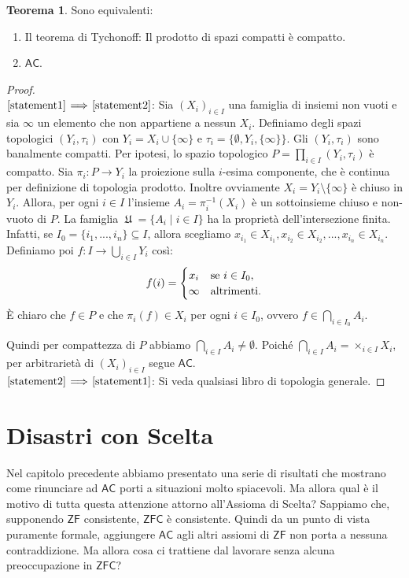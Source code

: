 \documentclass[12pt,a4paper]{report}
\theoremstyle{definition}
\newtheorem{teo}{Teorema}[section]  %
\theoremstyle{num.custom-title}
\DeclareMathOperator{\U}{\mathfrak{U}}
\DeclareMathOperator{\sm}{\setminus}
\DeclareMathOperator{\sse}{\subseteq}
\newcommand{\AC}{\ensuremath{\mathsf{AC}}\xspace}
\newcommand{\ZF}{\ensuremath{\mathsf{ZF}}\xspace}
\newcommand{\ZFC}{\ensuremath{\mathsf{ZFC}}\xspace}
\newcommand{\Implies}[2]{$\text{\ref{statement#1}}\!\implies\!\text{\ref{statement#2}}$}%
\newcommand{\punto}[1]{\item \label{statement#1}}
\newenvironment{equivalence}
    {\begin{enumerate}[label=(\arabic*),ref=(\arabic*)]
    }
    { 
	\end{enumerate}
    }
\begin{document}
\begin{teo} Sono equivalenti:
\begin{equivalence}
\punto{1} Il teorema di Tychonoff: Il prodotto di spazi compatti è compatto.
\punto{2} \AC.
\end{equivalence}
\begin{proof}\ \\
\Implies{1}{2}: Sia $(X_i)_{i \in I}$ una famiglia di insiemi non vuoti e sia $\infty$ un elemento che non appartiene a nessun $X_i$. Definiamo degli spazi topologici $(Y_i, \tau_i)$ con $Y_i = X_i \cup \{\infty\}$ e $\tau_i=\big\{\emptyset, Y_i, \{\infty\}\big\}$. Gli $(Y_i,\tau_i)$ sono banalmente compatti. Per ipotesi, lo spazio topologico $P= \prod_{i \in I} (Y_i, \tau_i)$ è compatto. Sia $\pi_i: P \to Y_i$ la proiezione sulla $i$-esima componente, che è continua per definizione di topologia prodotto. Inoltre ovviamente $X_i=Y_i \sm \{\infty\}$ è chiuso in $Y_i$. Allora, per ogni $i \in I$ l'insieme $A_i=\pi_i^{-1}(X_i)$ è un sottoinsieme chiuso e non-vuoto di $P$. La famiglia $\U=\{A_i \mid i \in I\}$ ha la proprietà dell'intersezione finita. Infatti, se $I_0=\{i_1,...,i_n\} \sse I$, allora scegliamo $x_{i_1} \in X_{i_1}, x_{i_2} \in X_{i_2}, ..., x_{i_n} \in X_{i_n}$. Definiamo poi $f: I \to \bigcup_{i \in I} Y_i$ così:
\[
f(i)=
  \begin{cases} 
      \hfill  x_i 		\hfill & \text{se } i \in I_0, \\
      \hfill  \infty		\hfill & \text{altrimenti}. \\
  \end{cases}
\]
È chiaro che $f \in P$ e che $\pi_i(f) \in X_i$ per ogni $i \in I_0$, ovvero $f \in \bigcap_{i \in I_0} A_i$.

Quindi per compattezza di $P$ abbiamo $\bigcap_{i \in I} A_i \neq \emptyset$. Poiché $\bigcap_{i \in I} A_i = \times_{i \in I} X_i$, per arbitrarietà di $(X_i)_{i \in I}$ segue \AC.\\
\Implies{2}{1}: Si veda qualsiasi libro di topologia generale.
\end{proof}
\end{teo}



\chapter{Disastri con Scelta}

Nel capitolo precedente abbiamo presentato una serie di risultati che mostrano come rinunciare ad \AC porti a situazioni molto spiacevoli. Ma allora qual è il motivo di tutta questa attenzione attorno all'Assioma di Scelta? Sappiamo che, supponendo \ZF consistente, \ZFC è consistente. Quindi da un punto di vista puramente formale, aggiungere \AC agli altri assiomi di \ZF non porta a nessuna contraddizione. Ma allora cosa ci trattiene dal lavorare senza alcuna preoccupazione in \ZFC?
\
\\
\end{document}

